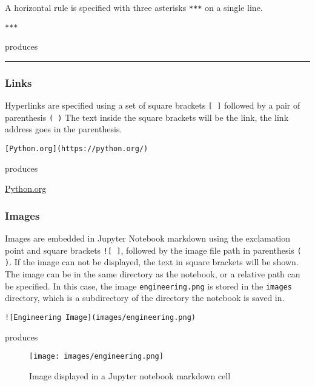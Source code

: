 \documentclass{book}
\makeatletter
\def\maxwidth{\ifdim\Gin@nat@width>\linewidth\linewidth
\else\Gin@nat@width\fi}
\let\Oldincludegraphics\includegraphics
\renewcommand{\includegraphics}[1]{\Oldincludegraphics[width=.8\maxwidth]{#1}}
\newcommand{\passthrough}[1]{#1}
\makeatother
\begin{document}
A horizontal rule is specified with three asterisks
\passthrough{\lstinline!***!} on a single line.

\begin{lstlisting}
***
\end{lstlisting}

produces

\begin{center}\rule{0.5\linewidth}{\linethickness}\end{center}

\hypertarget{links}{%
\subsubsection{Links}\label{links}}

Hyperlinks are specified using a set of square brackets
\passthrough{\lstinline![ ]!} followed by a pair of parenthesis
\passthrough{\lstinline!( )!} The text inside the square brackets will
be the link, the link address goes in the parenthesis.

\begin{lstlisting}
[Python.org](https://python.org/)
\end{lstlisting}

produces

\href{https://python.org}{Python.org}

\hypertarget{images}{%
\subsubsection{Images}\label{images}}

Images are embedded in Jupyter Notebook markdown using the exclamation
point and square brackets \passthrough{\lstinline"![ ]"}, followed by
the image file path in parenthesis \passthrough{\lstinline!( )!}. If the
image can not be displayed, the text in square brackets will be shown.
The image can be in the same directory as the notebook, or a relative
path can be specified. In this case, the image
\passthrough{\lstinline!engineering.png!} is stored in the
\passthrough{\lstinline!images!} directory, which is a subdirectory of
the directory the notebook is saved in.

\begin{lstlisting}
![Engineering Image](images/engineering.png)
\end{lstlisting}

produces

\begin{figure}
\centering
\texttt{[image: images/engineering.png]}
\caption{Image displayed in a Jupyter notebook markdown cell}
\end{figure}
\end{document}
